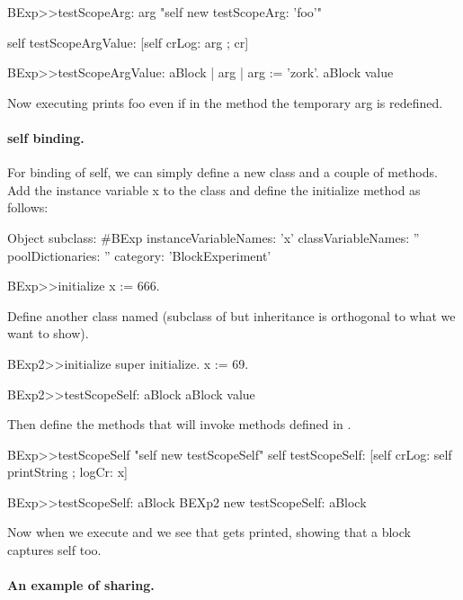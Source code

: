 \documentclass[a4paper,10pt,twoside]{book}
\begin{document}
\begin{code}{}
BExp>>testScopeArg: arg
	"self new testScopeArg: 'foo'"
	
	self testScopeArgValue: [self crLog: arg ; cr]

BExp>>testScopeArgValue: aBlock
	| arg | 
	arg := 'zork'.
	aBlock value
\end{code}

Now executing  prints foo even if in the method  the temporary arg is redefined.
 

\paragraph{self binding.}
For binding of self, we can simply define a new class and a couple of methods. 
Add the instance variable x to the class  and define the initialize method as follows:

\begin{code}{}
Object subclass: #BExp
	instanceVariableNames: 'x'
	classVariableNames: ''
	poolDictionaries: ''
	category: 'BlockExperiment'
\end{code}


\begin{code}{}
BExp>>initialize
	x := 666.
\end{code}	

Define another class named  (subclass of  but inheritance is orthogonal to what we want to show).


\begin{code}{}
BExp2>>initialize
	super initialize.
	x := 69.

BExp2>>testScopeSelf: aBlock
	aBlock value
\end{code}

Then define the methods that will invoke  methods defined in .
\begin{code}{}	
BExp>>testScopeSelf
	"self new testScopeSelf"
	self testScopeSelf: [self crLog: self printString ; logCr: x]

BExp>>testScopeSelf: aBlock
	BEXp2 new testScopeSelf: aBlock
\end{code}	

Now when we execute  and we see that  gets printed, showing that a block captures self too. 

\paragraph{An example of sharing.}
\end{document}

